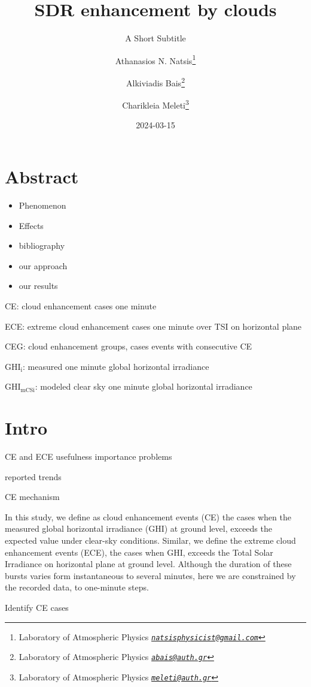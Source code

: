 \documentclass[
]{article}
\title{SDR enhancement by clouds}
\subtitle{A Short Subtitle}
\author{Athanasios N. Natsis\footnote{Laboratory of Atmospheric Physics \emph{\href{mailto:natsisphysicist@gmail.com}{\nolinkurl{natsisphysicist@gmail.com}}}} \and Alkiviadis Bais\footnote{Laboratory of Atmospheric Physics \emph{\href{mailto:abais@auth.gr}{\nolinkurl{abais@auth.gr}}}} \and Charikleia Meleti\footnote{Laboratory of Atmospheric Physics \emph{\href{mailto:meleti@auth.gr}{\nolinkurl{meleti@auth.gr}}}}}
\date{2024-03-15}
\providecommand{\tightlist}{%
  \setlength{\itemsep}{0pt}\setlength{\parskip}{0pt}}
\begin{document}
\maketitle

{
\setcounter{tocdepth}{4}
\tableofcontents
}
\hypertarget{abstract}{%
\section*{Abstract}\label{abstract}}

\begin{itemize}
\tightlist
\item
  Phenomenon
\item
  Effects
\item
  bibliography
\item
  our approach
\item
  our results
\end{itemize}

CE: cloud enhancement cases one minute

ECE: extreme cloud enhancement cases one minute over TSI on horizontal plane

CEG: cloud enhancement groups, cases events with consecutive CE

\(\text{GHI}_\text{i}\): measured one minute global horizontal irradiance

\(\text{GHI}_\text{mCSi}\): modeled clear sky one minute global horizontal irradiance

\hypertarget{intro}{%
\section{Intro}\label{intro}}

CE and ECE usefulness
importance
problems

reported trends

CE mechanism

In this study, we define as cloud enhancement events (CE) the cases when the measured
global horizontal irradiance (GHI) at ground level, exceeds the expected value under
clear-sky conditions.
Similar, we define the extreme cloud enhancement events (ECE), the cases when GHI,
exceeds the Total Solar Irradiance on horizontal plane at ground level.
Although the duration of these bursts varies form instantaneous to several minutes,
here we are constrained by the recorded data, to one-minute steps.

Identify CE cases
\end{document}
